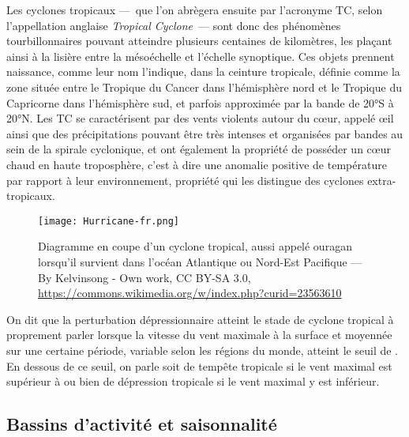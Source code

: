 \documentclass[../main.tex]{subfiles}
\begin{document}
Les cyclones tropicaux ---~que l'on abrègera ensuite par l'acronyme TC, selon l'appellation anglaise \textit{Tropical Cyclone}~--- sont donc des phénomènes
tourbillonnaires pouvant atteindre plusieurs centaines de kilomètres, les plaçant ainsi à la lisière entre la mésoéchelle et l'échelle synoptique. Ces objets
prennent naissance, comme leur nom l'indique, dans la ceinture tropicale, définie comme la zone située entre le Tropique du Cancer dans l'hémisphère nord et le
Tropique du Capricorne dans l'hémisphère sud, et parfois approximée par la bande de \ang{20}S à \ang{20}N. Les TC se caractérisent par des vents violents autour
du cœur, appelé œil ainsi que des précipitations pouvant être très intenses et organisées par bandes au sein de la spirale cyclonique, et ont également la
propriété de posséder un cœur chaud en haute troposphère, c'est à dire une anomalie positive de température par rapport à leur environnement, propriété qui les
distingue des cyclones extra-tropicaux.
%
\begin{figure}[t]
    \centering
    \texttt{[image: Hurricane-fr.png]}
    \caption{Diagramme en coupe d'un cyclone tropical, aussi appelé ouragan lorsqu'il survient dans l'océan Atlantique ou Nord-Est Pacifique --- By Kelvinsong -
    Own work, CC BY-SA 3.0, \url{https://commons.wikimedia.org/w/index.php?curid=23563610}}
    \label{fig:diagramme_TC}
\end{figure}
%
On dit que la perturbation dépressionnaire atteint le stade de cyclone tropical à proprement parler lorsque la vitesse du vent maximale à la surface et moyennée
sur une certaine période, variable selon les régions du monde, atteint le seuil de . En dessous de ce seuil, on parle soit de tempête tropicale si le
vent maximal est supérieur à  ou bien de dépression tropicale si le vent maximal y est inférieur.

\subsection{Bassins d'activité et saisonnalité}\label{sec:bassins_saisons}
\end{document}

